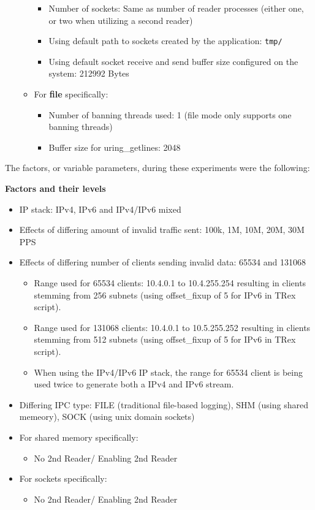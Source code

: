 \begin{itemize}
\begin{itemize}
\begin{itemize}
            \item Number of sockets\@: Same as number of reader processes (either one, or two when utilizing a second reader)
            \item Using default path to sockets created by the application\@: \texttt{tmp/}
            \item Using default socket receive and send buffer size configured on the system\@: 212992 Bytes
        \end{itemize}
        \item For \textbf{file} specifically\@:
        \begin{itemize}
            \item Number of banning threads used\@: 1 (file mode only supports one banning threads)
            \item Buffer size for uring\_getlines\@: 2048
        \end{itemize}
    \end{itemize}
\end{itemize}

\bigskip
\noindent
The factors, or variable parameters, during these experiments were the following\@:

\bigskip
\noindent
\textbf{Factors and their levels}
\begin{itemize}
    \item \ac{IP} stack: IPv4, IPv6 and IPv4/IPv6 mixed
    \item Effects of differing amount of invalid traffic sent: 100k, 1M, 10M, 20M, 30M \ac{PPS}
    \item Effects of differing number of clients sending invalid data: 65534 and 131068
    \begin{itemize}
        \item Range used for 65534 clients: 10.4.0.1 to 10.4.255.254 resulting in clients stemming from 256 subnets (using offset\_fixup of 5 for IPv6 in TRex script).
        \item Range used for 131068 clients: 10.4.0.1 to 10.5.255.252 resulting in clients stemming from 512 subnets (using offset\_fixup of 5 for IPv6 in TRex script).
        \item When using the IPv4/IPv6 \ac{IP} stack, the range for 65534 client is being used twice to generate both a IPv4 and IPv6 stream.
    \end{itemize}
    \item Differing \ac{IPC} type\@: FILE (traditional file-based logging), SHM (using shared memeory), SOCK (using unix domain sockets)
    \item For shared memory specifically:
    \begin{itemize}
        \item No 2nd Reader/ Enabling 2nd Reader
    \end{itemize}
    \item For sockets specifically:
    \begin{itemize}
        \item No 2nd Reader/ Enabling 2nd Reader
    \end{itemize}
\end{itemize}


